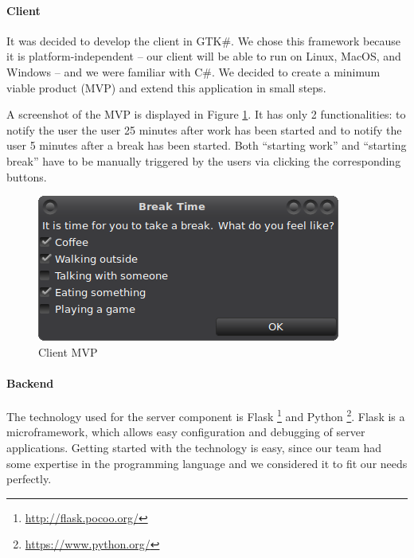 

\paragraph{Client} It was decided to develop the client in GTK\#. We chose this framework because it is platform-independent -- our client will be able to run on Linux, MacOS, and Windows -- and we were familiar with C\#. We decided to create a minimum viable product (MVP) and extend this application in small steps. 

A screenshot of the MVP is displayed in Figure \ref{fig:mvp-screenshot}. It has only 2 functionalities: to notify the user the user 25 minutes after work has been started and to notify the user 5 minutes after a break has been started. Both ``starting work'' and ``starting break'' have to be manually triggered by the users via clicking the corresponding buttons.

\begin{figure}
  \centering
  \includegraphics{images/mvp-screenshot.png}
  \caption{Client MVP}
  \label{fig:mvp-screenshot}
\end{figure}

\paragraph{Backend}
The technology used for the server component is Flask \footnote{\url{http://flask.pocoo.org/}} and Python \footnote{\url{https://www.python.org/}}. Flask is a microframework, which allows easy configuration and debugging of server applications. Getting started with the technology is easy, since our team had some expertise in the programming language and we considered it to fit our needs perfectly. 

